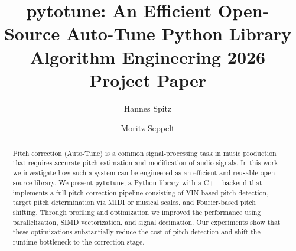 \documentclass[sigconf]{acmart}
\begin{document}
    \title[pytotune: An Efficient Open-Source Auto-Tune Python Library]{pytotune: An Efficient Open-Source Auto-Tune Python Library\\\large Algorithm Engineering 2026 Project Paper}


    \author{Hannes Spitz}

    \author{Moritz Seppelt}

    \begin{abstract}
    Pitch correction (Auto-Tune) is a common signal-processing task in music production that requires accurate pitch estimation and modification of audio signals. In this work we investigate how such a system can be engineered as an efficient and reusable open-source library. We present \texttt{pytotune}, a Python library with a C++ backend that implements a full pitch-correction pipeline consisting of YIN-based pitch detection, target pitch determination via MIDI or musical scales, and Fourier-based pitch shifting. Through profiling and optimization we improved the performance using parallelization, SIMD vectorization, and signal decimation. Our experiments show that these optimizations substantially reduce the cost of pitch detection and shift the runtime bottleneck to the correction stage. 
\end{abstract}


    \maketitle
\end{document}
